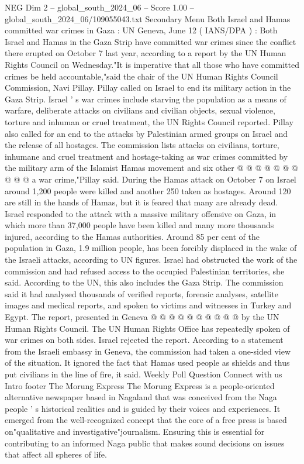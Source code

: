 \begin{textsample}{NEG Dim 2 – global\_south\_2024\_06 – Score 1.00 – global\_south\_2024\_06/109055043.txt}  \label{ex:f2_neg_332}
Secondary Menu Both Israel and Hamas committed war crimes in Gaza : UN Geneva, June 12 ( IANS/DPA ) : Both Israel and Hamas in the Gaza Strip have committed war crimes since the conflict there erupted on October 7 last year, according to a report by the UN Human Rights Council on Wednesday."It is imperative that all those who have committed crimes be held accountable,"said the chair of the UN Human Rights Council Commission, Navi Pillay.
Pillay called on Israel to end its military action in the Gaza Strip.
Israel ' s war crimes include starving the population as a means of warfare, deliberate attacks on civilians and civilian objects, sexual violence, torture and inhuman or cruel treatment, the UN Rights Council reported.
Pillay also called for an end to the attacks by Palestinian armed groups on Israel and the release of all hostages.
The commission lists attacks on civilians, torture, inhumane and cruel treatment and hostage-taking as war crimes committed by the military arm of the Islamist Hamas movement and six other @ @ @ @ @ @ @ @ @ @ a war crime,"Pillay said.
During the Hamas attack on October 7 on Israel around 1,200 people were killed and another 250 taken as hostages.
Around 120 are still in the hands of Hamas, but it is feared that many are already dead.
Israel responded to the attack with a massive military offensive on Gaza, in which more than 37,000 people have been killed and many more thousands injured, according to the Hamas authorities.
Around 85 per cent of the population in Gaza, 1.9 million people, has been forcibly displaced in the wake of the Israeli attacks, according to UN figures.
Israel had obstructed the work of the commission and had refused access to the occupied Palestinian territories, she said.
According to the UN, this also includes the Gaza Strip.
The commission said it had analysed thousands of verified reports, forensic analyses, satellite images and medical reports, and spoken to victims and witnesses in Turkey and Egypt.
The report, presented in Geneva @ @ @ @ @ @ @ @ @ @ by the UN Human Rights Council.
The UN Human Rights Office has repeatedly spoken of war crimes on both sides.
Israel rejected the report.
According to a statement from the Israeli embassy in Geneva, the commission had taken a one-sided view of the situation.
It ignored the fact that Hamas used people as shields and thus put civilians in the line of fire, it said.
Weekly Poll Question Connect with us Intro footer The Morung Express The Morung Express is a people-oriented alternative newspaper based in Nagaland that was conceived from the Naga people ' s historical realities and is guided by their voices and experiences.
It emerged from the well-recognized concept that the core of a free press is based on"qualitative and investigative"journalism.
Ensuring this is essential for contributing to an informed Naga public that makes sound decisions on issues that affect all spheres of life.

\end{textsample}
